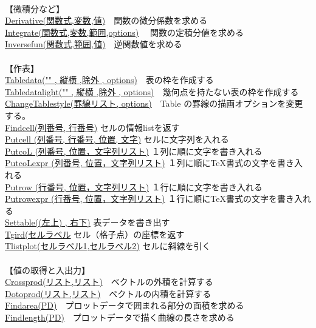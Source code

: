 \documentclass[papersize,a4paper,12pt,uplatex]{jsarticle}
\begin{document}
\begin{tabbing}
　\\
【微積分など】\\
\hyperlink{derivative}{Derivative(関数式,変数,値)}　\>関数の微分係数を求める\\
\hyperlink{integrate}{Integrate(関数式,変数,範囲,options)}　 \>関数の定積分値を求める\\
\hyperlink{inversefun}{Inversefun(関数式,範囲,値)}　\>逆関数値を求める\\
　\\
【作表】\\
\hyperlink{tabledata}{Tabledata("" , 縦横 ,除外 , options)}　\>表の枠を作成する\\
\hyperlink{tabledatalight}{Tabledatalight("" , 縦横 ,除外 , options)}　\>幾何点を持たない表の枠を作成する\\
\hyperlink{changetablestyle}{ChangeTablestyle(罫線リスト, options)}　\>Table の罫線の描画オプションを変更する。\\
\hyperlink{findcell}{Findcell(列番号, 行番号)}  \>セルの情報listを返す\\
\hyperlink{putcell}{Putcell (列番号, 行番号, 位置, 文字)}   \>セルに文字列を入れる\\
\hyperlink{putcol}{PutcoL (列番号, 位置，文字列リスト)}   \>１列に順に文字を書き入れる\\
\hyperlink{putcolexpr}{PutcoLexpr (列番号, 位置，文字列リスト)}  \>１列に順に\TeX 書式の文字を書き入れる\\
\hyperlink{putrow}{Putrow (行番号, 位置，文字列リスト)}   \>１行に順に文字を書き入れる\\
\hyperlink{putrowexpr}{Putrowexpr (行番号, 位置，文字列リスト)} \>１行に順に\TeX 書式の文字を書き入れる\\
\hyperlink{settable}{Settable((左上) , 右下)} \>表データを書き出す\\
\hyperlink{tgrid}{Tgird(セルラベル} \>セル（格子点）の座標を返す\\
\hyperlink{tlistplot}{Tlistplot(セルラベル1,セルラベル2)} \>セルに斜線を引く\\
　\\
【値の取得と入出力】\\
\hyperlink{crossprod}{Crossprod(リスト,リスト)}　\>ベクトルの外積を計算する\\
\hyperlink{dotprod}{Dotoprod(リスト,リスト)}　\>ベクトルの内積を計算する\\
\hyperlink{findarea}{Findarea(PD)}　\>プロットデータで囲まれる部分の面積を求める\\
\hyperlink{findlength}{Findlength(PD)}　\>プロットデータで描く曲線の長さを求める\\

\end{tabbing}
\end{document}
